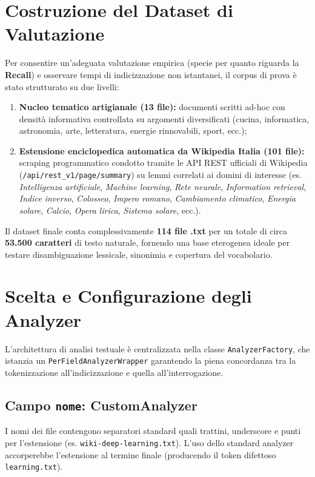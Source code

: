 \documentclass[11pt,a4paper]{article}
\begin{document}
\section{Costruzione del Dataset di Valutazione}
Per consentire un'adeguata valutazione empirica (specie per quanto riguarda la \textbf{Recall}) e osservare tempi di indicizzazione non istantanei, il corpus di prova è stato strutturato su due livelli:

\begin{enumerate}
    \item \textbf{Nucleo tematico artigianale (13 file):} documenti scritti ad-hoc con densità informativa controllata su argomenti diversificati (cucina, informatica, astronomia, arte, letteratura, energie rinnovabili, sport, ecc.);
    \item \textbf{Estensione enciclopedica automatica da Wikipedia Italia (101 file):} scraping programmatico condotto tramite le API REST ufficiali di Wikipedia (\texttt{/api/rest\_v1/page/summary}) su lemmi correlati ai domini di interesse (es. \textit{Intelligenza artificiale}, \textit{Machine learning}, \textit{Rete neurale}, \textit{Information retrieval}, \textit{Indice inverso}, \textit{Colosseo}, \textit{Impero romano}, \textit{Cambiamento climatico}, \textit{Energia solare}, \textit{Calcio}, \textit{Opera lirica}, \textit{Sistema solare}, ecc.).
\end{enumerate}

Il dataset finale conta complessivamente \textbf{114 file .txt} per un totale di circa \textbf{53.500 caratteri} di testo naturale, fornendo una base eterogenea ideale per testare disambiguazione lessicale, sinonimia e copertura del vocabolario.

\section{Scelta e Configurazione degli Analyzer}
L'architettura di analisi testuale è centralizzata nella classe \texttt{AnalyzerFactory}, che istanzia un \texttt{PerFieldAnalyzerWrapper} garantendo la piena concordanza tra la tokenizzazione all'indicizzazione e quella all'interrogazione.

\subsection{Campo \texttt{nome}: CustomAnalyzer}
I nomi dei file contengono separatori standard quali trattini, underscore e punti per l'estensione (es. \texttt{wiki-deep-learning.txt}). L'uso dello standard analyzer accorperebbe l'estensione al termine finale (producendo il token difettoso \texttt{learning.txt}). 
\end{document}

